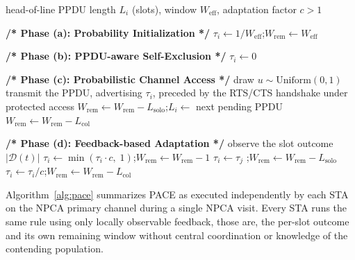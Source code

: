 \documentclass[journal,10pt]{IEEEtran}
\newcommand{\PHASE}[1]{\item[]{\normalfont\bfseries #1}}
\begin{document}
\begin{algorithm}[t]
\caption{PACE at STA $i$ during one NPCA visit}
\label{alg:pace}
\small
\begin{algorithmic}[1]
\REQUIRE head-of-line PPDU length $L_i$ (slots), window $W_\mathrm{eff}$, adaptation factor $c>1$
\PHASE {/* Phase (a): Probability Initialization */}
\STATE $\tau_i \leftarrow 1/W_\mathrm{eff}$;\quad $W_\mathrm{rem} \leftarrow W_\mathrm{eff}$
    \PHASE {/* Phase (b): PPDU-aware Self-Exclusion */}
        \STATE $\tau_i \leftarrow 0$
    \ENDIF
    \PHASE {/* Phase (c): Probabilistic Channel Access */}
    \STATE draw $u \sim \mathrm{Uniform}(0,1)$
        \STATE transmit the PPDU, advertising $\tau_i$, preceded by the RTS/CTS handshake under protected access
            \STATE $W_\mathrm{rem} \leftarrow W_\mathrm{rem} - L_\mathrm{solo}$;\quad $L_i \leftarrow$ next pending PPDU
        \ELSE
            \STATE $W_\mathrm{rem} \leftarrow W_\mathrm{rem} - L_\mathrm{col}$ 
        \ENDIF
    \ELSE
        \PHASE {/* Phase (d): Feedback-based Adaptation */}
        \STATE observe the slot outcome $|\mathcal{D}(t)|$
            \STATE $\tau_i \leftarrow \min(\tau_i \cdot c,\;1)$;\quad $W_\mathrm{rem} \leftarrow W_\mathrm{rem} - 1$
            \STATE $\tau_i \leftarrow \tau_j$ ;\quad $W_\mathrm{rem} \leftarrow W_\mathrm{rem} - L_\mathrm{solo}$
        \ELSE
            \STATE $\tau_i \leftarrow \tau_i / c$;\quad $W_\mathrm{rem} \leftarrow W_\mathrm{rem} - L_\mathrm{col}$
        \ENDIF
    \ENDIF
\ENDWHILE
\end{algorithmic}
\end{algorithm}

Algorithm~\ref{alg:pace} summarizes PACE as executed independently by each STA on the NPCA primary channel during a single NPCA visit. Every STA runs the same rule using only locally observable feedback, those are, the per-slot outcome and its own remaining window without central coordination or knowledge of the contending population.

\end{document}
